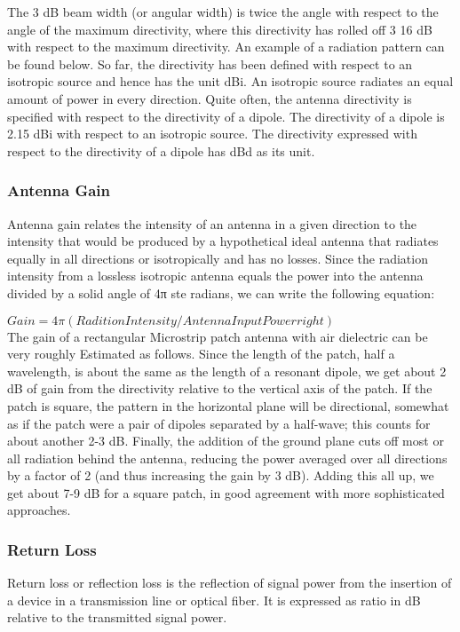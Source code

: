          The 3 dB beam width (or angular width) is twice the angle with respect to the angle of the maximum directivity, where this directivity has rolled off 3 16 dB with respect to the maximum directivity. An example of a radiation pattern can be found below. So far, the directivity has been defined with respect to an isotropic source and hence has the unit dBi. An isotropic source radiates an equal amount of power in every direction. Quite often, the antenna directivity is specified with respect to the directivity of a dipole. The  directivity of a dipole is 2.15 dBi with respect to an isotropic source. The directivity expressed with respect to the directivity of a dipole has dBd as its unit.

        \subsubsection{Antenna Gain}
         \justify

	        Antenna gain relates the intensity of an antenna in a given direction to the intensity that would be produced by a hypothetical ideal antenna that radiates equally in all directions or isotropically and has no losses. Since the radiation intensity from a lossless isotropic antenna equals the power into the antenna divided by a solid angle of 4π ste radians, we can write the following equation:\newline
						        
						       \centering 
						        $ Gain= 4 \pi (Radition Intensity / Antenna InputPower right ) $ \\
		   \justify
	        The gain of a rectangular Microstrip patch antenna with air dielectric can be very roughly Estimated as follows. Since the length of the patch, half a wavelength, is about the same as the length of a resonant dipole, we get about 2 dB of gain from the directivity relative to the vertical axis of the patch. If the patch is square, the pattern in the horizontal plane will be directional, somewhat as if the patch were a pair of dipoles separated by a half-wave; this counts for about another 2-3 dB. Finally, the addition of the ground plane cuts off most or all radiation behind the antenna, reducing the power averaged over all directions by a factor of 2 (and thus increasing the gain by 3 dB). Adding this all up, we get about 7-9 dB for a square patch, in good agreement with more sophisticated approaches.

        \subsubsection{Return Loss}\label{Return Loss}
		 \justify
          Return loss or reflection loss is the reflection of signal power from the insertion of a device in a transmission line or optical fiber. It is expressed as ratio in dB relative to the transmitted signal power.
   
